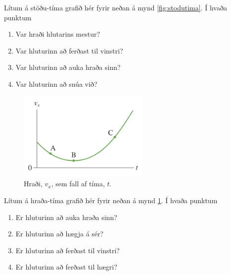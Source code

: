 \begin{enumerate}[label = \textbf{Dæmi \thechapter.\arabic*.}]
\begin{minipage}{\linewidth}
\item Lítum á stöðu-tíma grafið hér fyrir neðan á mynd \ref{fig:stodutima}. Í hvaða punktum
\begin{enumerate}[label = \textbf{(\alph*)}]
    \item Var hraði hlutarins mestur?
    \item Var hluturinn að ferðast til vinstri?
    \item Var hluturinn að auka hraða sinn?
    \item Var hluturinn að snúa við?
\end{enumerate}

\end{minipage}

\vspace{1cm}

\begin{minipage}{\linewidth}

\begin{figure}
\vspace{-1cm}
\centering
\includegraphics[width=2.5in]{images/hradatima.png}
\caption{Hraði, $v_x$, sem fall af tíma, $t$.}
\label{fig:hradatima}


\end{figure}

\item Lítum á hraða-tíma grafið hér fyrir neðan á mynd \ref{fig:hradatima}. Í hvaða punktum
\begin{enumerate}[label = \textbf{(\alph*)}]
    \item Er hluturinn að auka hraða sinn?
    \item Er hluturinn að hægja á sér?
    \item Er hluturinn að ferðast til vinstri?
    \item Er hluturinn að ferðast til hægri?
\end{enumerate}

\end{minipage}

\vspace{1cm}


\end{enumerate}
